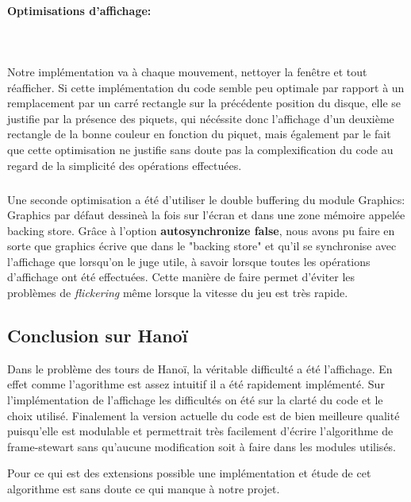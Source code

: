 \documentclass[a4paper,11pt]{article}
\begin{document}
\paragraph{Optimisations d'affichage:}\mbox{}\\\\
Notre implémentation va à chaque mouvement, nettoyer la fenêtre et tout réafficher.
Si cette implémentation du code semble peu optimale par rapport à un remplacement par un carré rectangle sur la précédente position du disque,
elle se justifie par la présence des piquets, qui nécéssite donc l'affichage d'un deuxième rectangle de la bonne couleur en fonction du piquet, mais également par le fait que cette optimisation ne justifie sans doute pas la complexification du code au regard de la simplicité des opérations effectuées.
\subparagraph{}
Une seconde optimisation a été d'utiliser le double buffering du module Graphics:
Graphics par défaut \og dessine\fg à la fois sur l'écran et dans une zone mémoire appelée backing store.
Grâce à l'option \textbf{autosynchronize false},
nous avons pu faire en sorte que graphics écrive que dans le "backing store" et qu'il se synchronise avec l'affichage que lorsqu'on le juge utile, à savoir lorsque toutes les opérations d'affichage ont été effectuées.
Cette manière de faire permet d'éviter les problèmes de \textit{flickering} même lorsque la vitesse du jeu est très rapide.
\subsection{Conclusion sur Hanoï}
Dans le problème des tours de Hanoï, la véritable difficulté a été l'affichage. 
En effet comme l'agorithme est assez intuitif il a été rapidement implémenté.
Sur l'implémentation de l'affichage les difficultés on été sur la clarté du code et le choix utilisé.
Finalement la version actuelle du code est de bien meilleure qualité puisqu'elle est modulable et permettrait très facilement d'écrire l'algorithme de frame-stewart sans qu'aucune modification soit à faire dans les modules utilisés.

Pour ce qui est des extensions possible une implémentation et étude de cet algorithme est sans doute ce qui manque à notre projet.
 
\end{document}
